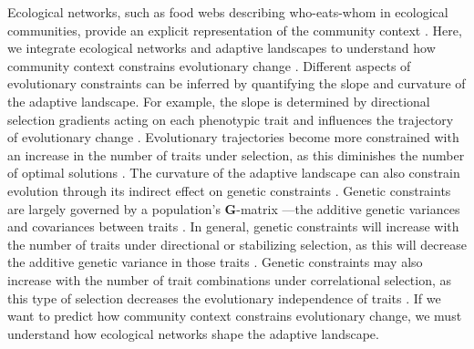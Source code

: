\documentclass[11pt,]{article}
\begin{document}
Ecological networks, such as food webs describing who-eats-whom in
ecological communities, provide an explicit representation of the
community context \citep{Bascompte2014, McCann2012}. Here, we integrate
ecological networks and adaptive landscapes to understand how community
context constrains evolutionary change \citep{Arnold1992}. Different
aspects of evolutionary constraints can be inferred by quantifying the
slope and curvature of the adaptive landscape. For example, the slope is
determined by directional selection gradients acting on each phenotypic
trait and influences the trajectory of evolutionary change
\citep{Lande1979, Arnold1992}. Evolutionary trajectories become more
constrained with an increase in the number of traits under selection, as
this diminishes the number of optimal solutions \citep{Arnold2003}. The
curvature of the adaptive landscape can also constrain evolution through
its indirect effect on genetic constraints
\citep{Arnold1992, Hansen2008}. Genetic constraints are largely governed
by a population's \textbf{G}-matrix ---the additive genetic variances
and covariances between traits \citep{Hansen2008}. In general, genetic
constraints will increase with the number of traits under directional or
stabilizing selection, as this will decrease the additive genetic
variance in those traits \citep{Hansen2008}. Genetic constraints may
also increase with the number of trait combinations under correlational
selection, as this type of selection decreases the evolutionary
independence of traits \citep{Hansen2008}. If we want to predict how
community context constrains evolutionary change, we must understand how
ecological networks shape the adaptive landscape.
\end{document}
